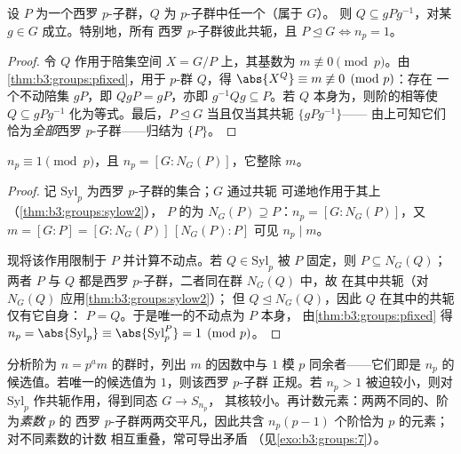 \begin{theorem}[西罗 II：支配与共轭]\label{thm:b3:groups:sylow2}
设 $P$ 为一个西罗 $p$-子群，$Q$ 为 $p$-子群中任一个（属于 $G$）。
则 $Q \subseteq gPg^{-1}$，对某 $g \in G$ 成立。特别地，所有
西罗 $p$-子群彼此共轭，且 $P \trianglelefteq G \iff
n_p = 1$。
\end{theorem}

\begin{proof}
令 $Q$ 作用于陪集空间 $X = G/P$ 上，其基数为 $m
\not\equiv 0 \pmod p$。由\cref{thm:b3:groups:pfixed}，用于
$p$-群 $Q$，得 $\abs{X^Q} \equiv m \not\equiv 0 \pmod p$：存在
一个不动陪集 $gP$，即 $QgP = gP$，亦即 $g^{-1}Qg \subseteq
P$。若 $Q$ 本身为，则阶的相等使
$Q \subseteq gPg^{-1}$ 化为等式。最后，$P
\trianglelefteq G$ 当且仅当其共轭 $\{gPg^{-1}\}$——
由上可知它们恰为\emph{全部}西罗 $p$-子群——归结为
$\{P\}$。
\end{proof}

\begin{theorem}[西罗第三定理：计数]\label{thm:b3:groups:sylow3}
$n_p \equiv 1 \pmod p$，且 $n_p = [G : N_G(P)]$，它整除
$m$。
\end{theorem}

\begin{proof}
记 $\mathrm{Syl}_p$ 为西罗 $p$-子群的集合；$G$ 通过共轭
可递地作用于其上（\cref{thm:b3:groups:sylow2}），
$P$ 的为 $N_G(P) \supseteq P$：$n_p = [G :
N_G(P)]$，又 $m = [G:P] = [G:N_G(P)]\,[N_G(P):P]$ 可见 $n_p \mid
m$。

现将该作用限制于 $P$ 并计算不动点。若 $Q \in
\mathrm{Syl}_p$ 被 $P$ 固定，则 $P \subseteq N_G(Q)$；两者
$P$ 与 $Q$ 都是西罗 $p$-子群，二者同在群 $N_G(Q)$ 中，故
在其中共轭（对 $N_G(Q)$ 应用\cref{thm:b3:groups:sylow2}）；
但 $Q \trianglelefteq N_G(Q)$，因此 $Q$ 在其中的共轭仅有它自身：
$P = Q$。于是唯一的不动点为 $P$ 本身，
由\cref{thm:b3:groups:pfixed} 得 $n_p = \abs{\mathrm{Syl}_p}
\equiv \abs{\mathrm{Syl}_p^P} = 1 \pmod p$。
\end{proof}

\begin{method}\label{met:b3:groups:sylowmethod}
分析阶为 $n = p^a m$ 的群时，列出
$m$ 的因数中与 $1$ 模 $p$ 同余者——它们即是
$n_p$ 的候选值。若唯一的候选值为 $1$，则该西罗 $p$-子群
正规。若 $n_p > 1$ 被迫较小，则对
$\mathrm{Syl}_p$ 作共轭作用，得到同态 $G \to S_{n_p}$，
其核较小。再计数元素：两两不同的、阶为\emph{素数} $p$ 的
西罗 $p$-子群两两交平凡，因此共含
$n_p(p-1)$ 个阶恰为 $p$ 的元素；对不同素数的计数
相互重叠，常可导出矛盾
（见\cref{exo:b3:groups:7}）。
\end{method}


